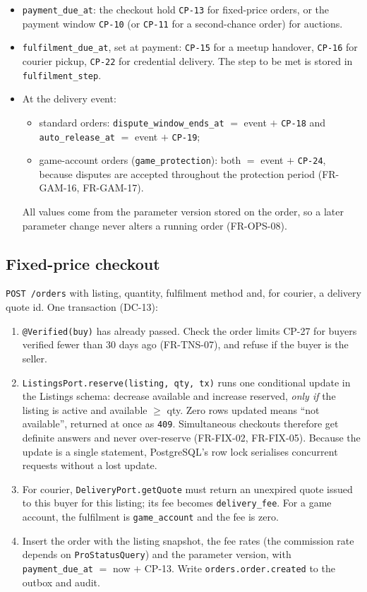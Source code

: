 \documentclass[11pt,a4paper]{article}
\begin{document}
\begin{itemize}[nosep]
  \item \texttt{payment\_due\_at}: the checkout hold \texttt{CP-13} for fixed-price orders, or the payment window \texttt{CP-10} (or \texttt{CP-11} for a second-chance order) for auctions.
  \item \texttt{fulfilment\_due\_at}, set at payment: \texttt{CP-15} for a meetup handover, \texttt{CP-16} for courier pickup, \texttt{CP-22} for credential delivery. The step to be met is stored in \texttt{fulfilment\_step}.
  \item At the delivery event:
  \begin{itemize}[nosep]
    \item standard orders: \texttt{dispute\_window\_ends\_at} $=$ event $+$ \texttt{CP-18} and \texttt{auto\_release\_at} $=$ event $+$ \texttt{CP-19};
    \item game-account orders (\texttt{game\_protection}): both $=$ event $+$ \texttt{CP-24}, because disputes are accepted throughout the protection period (FR-GAM-16, FR-GAM-17).
  \end{itemize}
  All values come from the parameter version stored on the order, so a later parameter change never alters a running order (FR-OPS-08).
\end{itemize}

\subsection{Fixed-price checkout}
\label{sec:checkout}
\texttt{POST /orders} with listing, quantity, fulfilment method and, for courier, a delivery quote id. One transaction (DC-13):
\begin{enumerate}[nosep]
  \item \texttt{@Verified(buy)} has already passed. Check the order limits CP-27 for buyers verified fewer than 30 days ago (FR-TNS-07), and refuse if the buyer is the seller.
  \item \texttt{ListingsPort.reserve(listing, qty, tx)} runs one conditional update in the Listings schema: decrease available and increase reserved, \emph{only if} the listing is active and available $\ge$ qty. Zero rows updated means ``not available'', returned at once as \texttt{409}. Simultaneous checkouts therefore get definite answers and never over-reserve (FR-FIX-02, FR-FIX-05). Because the update is a single statement, PostgreSQL's row lock serialises concurrent requests without a lost update.
  \item For courier, \texttt{DeliveryPort.getQuote} must return an unexpired quote issued to this buyer for this listing; its fee becomes \texttt{delivery\_fee}. For a game account, the fulfilment is \texttt{game\_account} and the fee is zero.
  \item Insert the order with the listing snapshot, the fee rates (the commission rate depends on \texttt{ProStatus\-Query}) and the parameter version, with \texttt{payment\_due\_at} $=$ now $+$ CP-13. Write \texttt{orders.order.created} to the outbox and audit.
\end{enumerate}
\end{document}
